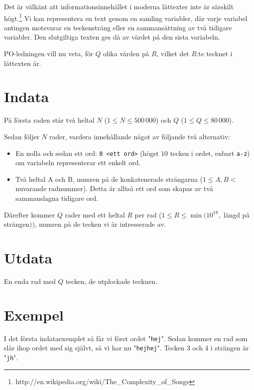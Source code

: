 
Det är välkänt att informationsinnehållet i moderna låttexter inte är särskilt
högt.\footnote{http://en.wikipedia.org/wiki/The\_Complexity\_of\_Songs}
Vi kan representera en text genom en samling variabler, där varje
variabel antingen motsvarar en teckensträng eller en sammansättning av två
tidigare variabler. Den slutgiltiga texten ges då av värdet på den sista
variabeln.

PO-ledningen vill nu veta, för $Q$ olika värden på $R$, vilket det $R$:te tecknet i
låttexten är.

\section*{Indata}

På första raden står två heltal $N$ ($1 \leq N \leq 500\,000$) och $Q$ ($1 \leq Q
\leq 80\,000$).

Sedan följer $N$ rader, vardera innehållande något av följande två alternativ:

\begin{itemize}
\item En nolla och sedan ett ord: \texttt{0 <ett ord>} (högst $10$ tecken i
      ordet, enbart \texttt{a-z}) om variabeln representerar ett enkelt ord.
\item Två heltal A och B, numren på de konkatenerade strängarna
      ($1 \leq A, B < $ nuvarande radnummer). Detta är alltså ett ord som skapas
      av två sammanslagna tidigare ord.
\end{itemize}

Därefter kommer $Q$ rader med ett heltal $R$ per rad ($1 \leq R \leq \min(10^{18},$ längd på
strängen$))$, numren på de tecken vi är intresserade av.

\section*{Utdata}

En enda rad med $Q$ tecken, de utplockade tecknen.

\section*{Exempel}

I det första indataexemplet så får vi först ordet "\texttt{hej}". Sedan kommer en rad som slår ihop
ordet med sig självt, så vi har nu "\texttt{hejhej}". Tecken 3 och 4 i strängen är "\texttt{jh}".

